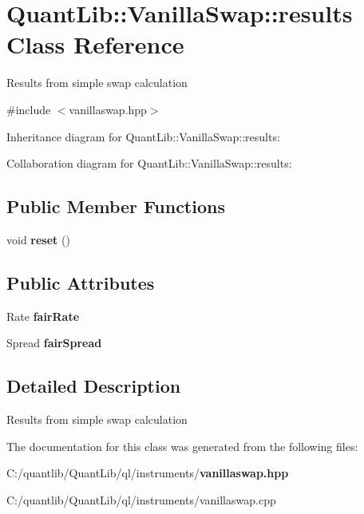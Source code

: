 \section{Quant\+Lib\+:\+:Vanilla\+Swap\+:\+:results Class Reference}
\label{class_quant_lib_1_1_vanilla_swap_1_1results}


Results from simple swap calculation  




{\ttfamily \#include $<$vanillaswap.\+hpp$>$}



Inheritance diagram for Quant\+Lib\+:\+:Vanilla\+Swap\+:\+:results\+:


Collaboration diagram for Quant\+Lib\+:\+:Vanilla\+Swap\+:\+:results\+:
\subsection*{Public Member Functions}
\begin{DoxyCompactItemize}
\item 
void {\bfseries reset} ()\label{class_quant_lib_1_1_vanilla_swap_1_1results_ab4a66b7d3fbab44c50301ca59253042c}

\end{DoxyCompactItemize}
\subsection*{Public Attributes}
\begin{DoxyCompactItemize}
\item 
Rate {\bfseries fair\+Rate}\label{class_quant_lib_1_1_vanilla_swap_1_1results_a499c96cd09a633d16595e3f9e71cf445}

\item 
Spread {\bfseries fair\+Spread}\label{class_quant_lib_1_1_vanilla_swap_1_1results_a1b7f5bb0213af14ac7465bf239794022}

\end{DoxyCompactItemize}


\subsection{Detailed Description}
Results from simple swap calculation 

The documentation for this class was generated from the following files\+:\begin{DoxyCompactItemize}
\item 
C\+:/quantlib/\+Quant\+Lib/ql/instruments/{\bf vanillaswap.\+hpp}\item 
C\+:/quantlib/\+Quant\+Lib/ql/instruments/vanillaswap.\+cpp\end{DoxyCompactItemize}

